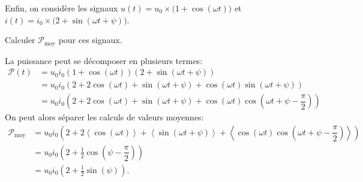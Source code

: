 Enfin, on considère les signaux 
$u(t)=u_{0}\times \big(1+\cos(\omega t)\big)$
et
$i(t)=i_{0}\times \big(2+\sin\left(\omega t+\psi\right)\big)$.

\repriseEntrainement





\begin{enonce}
Calculer $\mathcal{P}_{\text{moy}}$ pour ces signaux.
\end{enonce}


\begin{corrigeNewpage}
La puissance peut se décomposer en plusieurs termes:
\begin{align*}
\mathcal{P}(t) & =u_{0}i_{0}\left(1+\cos(\omega t)\right)\left(2+\sin\left(\omega t+\psi\right)\right)\\
 & =u_{0}i_{0}\left(2+2\cos(\omega t)+\sin\left(\omega t+\psi\right)+\cos(\omega t)\sin\left(\omega t+\psi\right)\right)\\
 & =u_{0}i_{0}\left(2+2\cos(\omega t)+\sin\left(\omega t+\psi\right)+\cos(\omega t)\cos\left(\omega t+\psi-\dfrac{\pi}{2}\right)\right)
\end{align*}
On peut alors séparer les calculs de valeurs moyennes:
\begin{align*}
\mathcal{P}_{\text{moy}} & =u_{0}i_{0}\left(2+2\left\langle \cos(\omega t)\right\rangle +\left\langle \sin\left(\omega t+\psi\right)\right\rangle +\left\langle \cos(\omega t)\cos\left(\omega t+\psi-\dfrac{\pi}{2}\right)\right\rangle \right)\\
 & =u_{0}i_{0}\left(2+\frac{1}{2}\cos\left(\psi-\dfrac{\pi}{2}\right)\right)\\
 & =u_{0}i_{0}\left(2+\frac{1}{2}\sin(\psi)\right).
\end{align*}
\end{corrigeNewpage}


\finEntrainement




